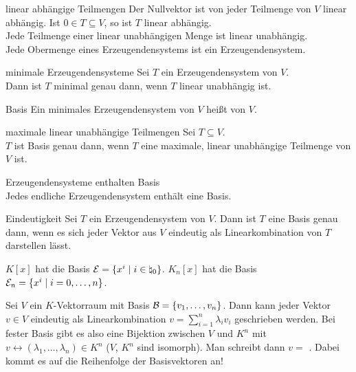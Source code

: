 \begin{Satz}{linear abhängige Teilmengen}
    Der Nullvektor ist von jeder Teilmenge von $V$ linear abhängig.
    Ist $0 \in T \subseteq V$, so ist $T$ linear abhängig. \\
    Jede Teilmenge einer linear unabhängigen Menge ist linear unabhängig. \\
    Jede Obermenge eines Erzeugendensystems ist ein Erzeugendensystem.
\end{Satz}

\begin{Satz}{minimale Erzeugendensysteme}
    Sei $T$ ein Erzeugendensystem von $V$. \\
    Dann ist $T$ minimal genau dann, wenn $T$ linear unabhängig ist.
\end{Satz}

\begin{Def}{Basis}
    Ein minimales Erzeugendensystem von $V$ heißt  von $V$.
\end{Def}

\begin{Satz}{maximale linear unabhängige Teilmengen}
    Sei $T \subseteq V$. \\
    $T$ ist Basis genau dann, wenn $T$ eine maximale, linear
    unabhängige Teilmenge von $V$ ist.
\end{Satz}

\begin{Satz}{Erzeugendensysteme enthalten Basis} \\
    Jedes endliche Erzeugendensystem enthält eine Basis.
\end{Satz}

\begin{Satz}{Eindeutigkeit}
    Sei $T$ ein Erzeugendensystem von $V$.
    Dann ist $T$ eine Basis genau dann, wenn es sich jeder Vektor aus $V$
    eindeutig als Linearkombination von $T$ darstellen lässt.
\end{Satz}

\begin{Kor}
    $K[x]$ hat die Basis $\mathcal{E} = \{x^i \;|\; i \in \natural_0\}$.
    $K_n[x]$ hat die Basis $\mathcal{E}_n = \{x^i \;|\; i = 0, \ldots, n\}$.
\end{Kor}

\begin{Bem}
    Sei $V$ ein $K$-Vektorraum mit Basis $\mathcal{B} = \{v_1, \ldots, v_n\}$.
    Dann kann jeder Vektor $v \in V$ eindeutig als Linearkombination
    $v = \sum_{i=1}^n \lambda_i v_i$ geschrieben werden.
    Bei fester Basis gibt es also eine Bijektion zwischen $V$ und $K^n$ mit
    $v \leftrightarrow (\lambda_1, \ldots, \lambda_n) \in K^n$
    ($V$, $K^n$ sind isomorph).
    Man schreibt dann $v =$
    .
    Dabei kommt es auf die Reihenfolge der Basisvektoren an!
\end{Bem}

